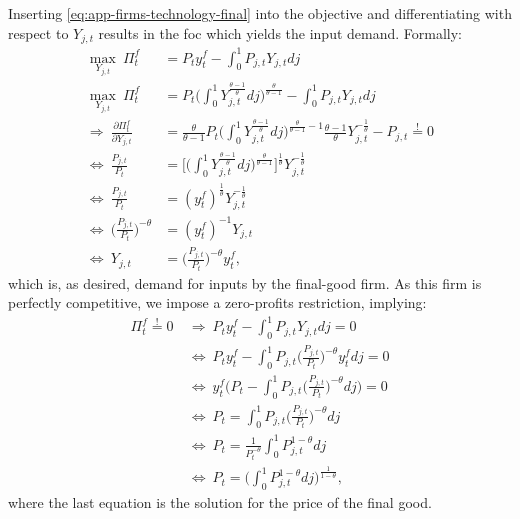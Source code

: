 \documentclass[a4paper,12pt]{article} %
\numberwithin{equation}{section} %
\numberwithin{figure}{section}
\numberwithin{table}{section}
\begin{document}
\begin{refsection}
\begin{appendices}
Inserting \eqref{eq:app-firms-technology-final} into the objective and differentiating with respect to $Y_{j,t}$ results in the \Gls{foc} which yields the input demand. Formally:
\begin{align}
    \max_{Y_{j,t}} \ \Pi_t^f &= P_t y_t^f - \int_0^1 P_{j,t} Y_{j,t} dj \nonumber \\
    \max_{Y_{j,t}} \ \Pi_t^f &= P_t \Bigg( \int_0^1 Y_{j,t}^{\frac{\theta - 1}{\theta}} dj \Bigg)^{\frac{\theta}{\theta-1}} - \int_0^1 P_{j,t} Y_{j,t} dj \nonumber \\
    \Rightarrow \ \frac{\partial \Pi_t^f}{\partial Y_{j,t}} &= \frac{\theta}{\theta - 1} P_t \Bigg( \int_0^1 Y_{j,t}^{\frac{\theta - 1}{\theta}} dj \Bigg)^{\frac{\theta}{\theta-1}-1} \frac{\theta-1}{\theta} Y_{j,t}^{-\frac{1}{\theta}} - P_{j,t} \overset{!}{=} 0 \nonumber \\
    \Leftrightarrow \ \frac{P_{j,t}}{P_t} &= \Bigg[ \Bigg( \int_0^1 Y_{j,t}^{\frac{\theta - 1}{\theta}} dj \Bigg)^{\frac{\theta}{\theta-1}} \Bigg]^{\frac{1}{\theta}} Y_{j,t}^{-\frac{1}{\theta}} \nonumber  \\
    \Leftrightarrow \ \frac{P_{j,t}}{P_t} &= (y_t^f)^{\frac{1}{\theta}} Y_{j,t}^{-\frac{1}{\theta}} \nonumber \\
    \Leftrightarrow \ \Bigg( \frac{P_{j,t}}{P_t} \Bigg)^{-\theta} &= (y_t^f)^{-1} Y_{j,t} \nonumber \\
    \Leftrightarrow \ Y_{j,t} &= \Bigg( \frac{P_{j,t}}{P_t} \Bigg)^{-\theta} y_t^f, \label{eq:app-firms-input-demand}
\end{align}
which is, as desired, demand for inputs by the final-good firm. As this firm is perfectly competitive, we impose a zero-profits restriction, implying:
\begin{align}
    \Pi_t^f \overset{!}{=} 0 \ &\Rightarrow \ P_t y_t^f - \int_0^1 P_{j,t} Y_{j,t} dj = 0 \nonumber \\
    &\Leftrightarrow \ P_t y_t^f - \int_0^1 P_{j,t} \Bigg( \frac{P_{j,t}}{P_t} \Bigg)^{-\theta} y_t^f dj = 0 \nonumber \\
    &\Leftrightarrow \ y_t^f \Bigg( P_t - \int_0^1 P_{j,t} \Bigg( \frac{P_{j,t}}{P_t} \Bigg)^{-\theta} dj \Bigg) = 0 \nonumber \\
    &\Leftrightarrow \ P_t = \int_0^1 P_{j,t} \Bigg( \frac{P_{j,t}}{P_t} \Bigg)^{-\theta} dj \nonumber \\
    &\Leftrightarrow \ P_t = \frac{1}{P_t^{-\theta}} \int_0^1 P_{j,t}^{1-\theta} dj \nonumber \\ 
    &\Leftrightarrow \ P_t = \Bigg( \int_0^1 P_{j,t}^{1-\theta} dj \Bigg)^{\frac{1}{1-\theta}}, \nonumber
\end{align}
where the last equation is the solution for the price of the final good.


\end{appendices}
\end{refsection}
\end{document}
